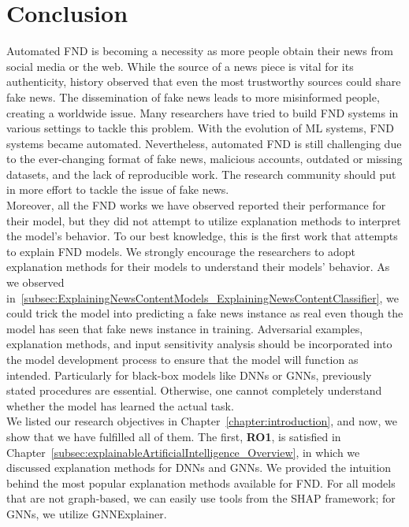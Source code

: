 
\chapter{Conclusion}\label{chapter:conclusion}
Automated FND is becoming a necessity as more people obtain their news from social media or the web. While the source of a news piece is vital for its authenticity, history observed that even the most trustworthy sources could share fake news. The dissemination of fake news leads to more misinformed people, creating a worldwide issue. Many researchers have tried to build FND systems in various settings to tackle this problem. With the evolution of ML systems, FND systems became automated. Nevertheless, automated FND is still challenging due to the ever-changing format of fake news, malicious accounts, outdated or missing datasets, and the lack of reproducible work. The research community should put in more effort to tackle the issue of fake news.\\
Moreover, all the FND works we have observed reported their performance for their model, but they did not attempt to utilize explanation methods to interpret the model's behavior. To our best knowledge, this is the first work that attempts to explain FND models. We strongly encourage the researchers to adopt explanation methods for their models to understand their models' behavior. As we observed in~\ref{subsec:ExplainingNewsContentModels_ExplainingNewsContentClassifier}, we could trick the model into predicting a fake news instance as real even though the model has seen that fake news instance in training. Adversarial examples, explanation methods, and input sensitivity analysis should be incorporated into the model development process to ensure that the model will function as intended. Particularly for black-box models like DNNs or GNNs, previously stated procedures are essential. Otherwise, one cannot completely understand whether the model has learned the actual task.\\
We listed our research objectives in Chapter~\ref{chapter:introduction}, and now, we show that we have fulfilled all of them. The first, \textbf{RO1}, is satisfied in Chapter~\ref{subsec:explainableArtificialIntelligence_Overview}, in which we discussed explanation methods for DNNs and GNNs. We provided the intuition behind the most popular explanation methods available for FND. For all models that are not graph-based, we can easily use tools from the SHAP framework; for GNNs, we utilize GNNExplainer. \\
